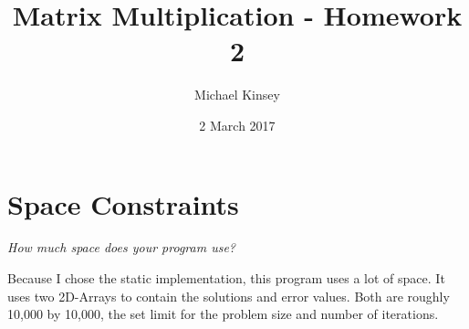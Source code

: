 \documentclass[options]{article}
\begin{document}
	\title{Matrix Multiplication - Homework 2}
	\author{Michael Kinsey}
	\date{2 March 2017}
	\maketitle
	
	\section{Space Constraints}
	\textit{How much space does your program use?}
	
	Because I chose the static implementation, this program uses a lot of space. It uses two 2D-Arrays to contain the solutions and 
	error values. Both are roughly 10,000 by 10,000, the set limit for the problem size and number of iterations. 
	
\end{document}
